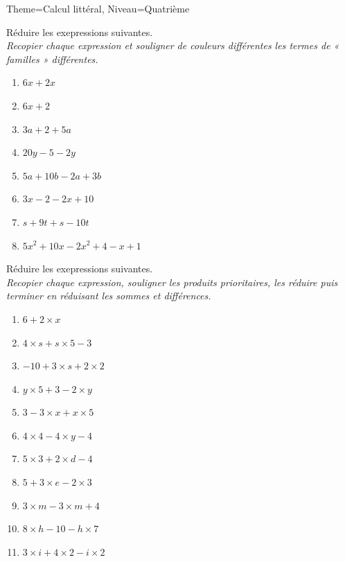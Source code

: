 \documentclass[11pt]{article}
\begin{document}
\begin{multicols}{2}
\begin{Maquette}[Fiche]{Theme=Calcul littéral, Niveau=Quatrième}
        \begin{exercice}
            Réduire les exepressions suivantes.\\
            \emph{Recopier chaque expression et souligner de couleurs différentes les termes de « familles » différentes.}
            \begin{enumerate}[label=\textbf{\alph*.}]
                \item $6x + 2x$
                \item $6x + 2$
                \item $3a + 2 + 5a$
                \item $20y - 5 -2y$
                \item $5a + 10b - 2a + 3b$
                \item $3x -2 -2x + 10$
                \item $s + 9t + s - 10t$
                \item $5x^2 + 10x - 2x^2 + 4 - x + 1$
            \end{enumerate}
        \end{exercice}

        \begin{exercice}
            Réduire les exepressions suivantes.\\
            \emph{Recopier chaque expression, souligner les produits prioritaires, les réduire puis terminer en réduisant les sommes et différences.}
            \begin{enumerate}[label=\textbf{\alph*.}]
                \item $6 + 2 \times x$
                \item $4 \times s + s \times 5 - 3$
                \item $-10 + 3 \times s + 2 \times 2$
                \item $y \times 5 + 3 - 2 \times y$
                \item $3 - 3 \times x + x \times 5$
                \item $4 \times 4 - 4 \times y - 4$
                \item $5 \times 3 + 2 \times d - 4$
                \item $5 + 3 \times e - 2 \times 3$
                \item $3 \times m - 3 \times m + 4$
                \item $8 \times h - 10 - h \times 7$
                \item $3 \times i + 4 \times 2 - i \times 2$
            \end{enumerate}
        \end{exercice}


\end{Maquette}
\end{multicols}
\end{document}
